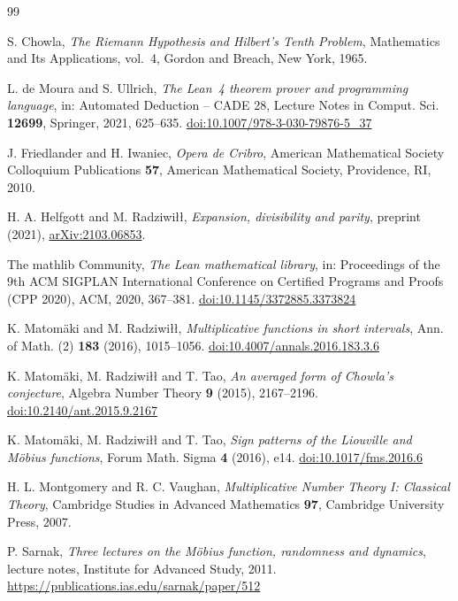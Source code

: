 \documentclass[11pt]{amsart}
\numberwithin{equation}{section}
\theoremstyle{plain}
\theoremstyle{definition}
\theoremstyle{remark}
\begin{document}
\begin{thebibliography}{99}

 S. Chowla, \emph{The Riemann Hypothesis and Hilbert's Tenth Problem}, Mathematics and Its Applications, vol.~4, Gordon and Breach, New York, 1965.

 L. de Moura and S. Ullrich, \emph{The Lean~4 theorem prover and programming language}, in: Automated Deduction -- CADE 28, Lecture Notes in Comput. Sci. \textbf{12699}, Springer, 2021, 625--635. \href{https://doi.org/10.1007/978-3-030-79876-5_37}{doi:10.1007/978-3-030-79876-5\_37}

 J. Friedlander and H. Iwaniec, \emph{Opera de Cribro}, American Mathematical Society Colloquium Publications \textbf{57}, American Mathematical Society, Providence, RI, 2010.

 H. A. Helfgott and M. Radziwiłł, \emph{Expansion, divisibility and parity}, preprint (2021), \href{https://arxiv.org/abs/2103.06853}{arXiv:2103.06853}.

 The mathlib Community, \emph{The Lean mathematical library}, in: Proceedings of the 9th ACM SIGPLAN International Conference on Certified Programs and Proofs (CPP 2020), ACM, 2020, 367--381. \href{https://doi.org/10.1145/3372885.3373824}{doi:10.1145/3372885.3373824}

 K. Matomäki and M. Radziwiłł, \emph{Multiplicative functions in short intervals}, Ann. of Math. (2) \textbf{183} (2016), 1015--1056. \href{https://doi.org/10.4007/annals.2016.183.3.6}{doi:10.4007/annals.2016.183.3.6}

 K. Matomäki, M. Radziwiłł and T. Tao, \emph{An averaged form of Chowla's conjecture}, Algebra Number Theory \textbf{9} (2015), 2167--2196. \href{https://doi.org/10.2140/ant.2015.9.2167}{doi:10.2140/ant.2015.9.2167}

 K. Matomäki, M. Radziwiłł and T. Tao, \emph{Sign patterns of the Liouville and Möbius functions}, Forum Math. Sigma \textbf{4} (2016), e14. \href{https://doi.org/10.1017/fms.2016.6}{doi:10.1017/fms.2016.6}

 H. L. Montgomery and R. C. Vaughan, \emph{Multiplicative Number Theory I: Classical Theory}, Cambridge Studies in Advanced Mathematics \textbf{97}, Cambridge University Press, 2007.

 P. Sarnak, \emph{Three lectures on the Möbius function, randomness and dynamics}, lecture notes, Institute for Advanced Study, 2011. \url{https://publications.ias.edu/sarnak/paper/512}


\end{thebibliography}
\end{document}
